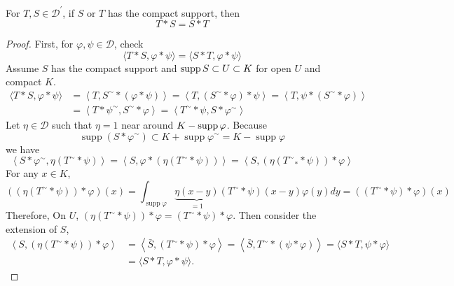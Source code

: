 \begin{enumerate}[label=\arabic*.]
	\begin{prop}
		For $T,S \in \mathcal{D}^\prime$, if $S$ or $T$ has the compact support, then
		\begin{equation*}
			T*S = S*T
		\end{equation*}
	\end{prop}
	\begin{proof}
		First, for $\varphi,\psi \in \mathcal{D}$, check
		\begin{equation*}
			\langle T * S, \varphi * \psi\rangle=\langle S * T, \varphi * \psi\rangle
		\end{equation*}
		Assume $S$ has the compact support and $\operatorname{supp} S \subset U \subset K$ for open $U$ and compact $K$. 
		\begin{equation*}
			\begin{aligned}
				\langle T * S, \varphi * \psi\rangle & =\left\langle T, S^{\sim} *(\varphi * \psi)\right\rangle=\left\langle T,\left(S^{\sim} * \varphi\right) * \psi\right\rangle=\left\langle T, \psi *\left(S^{\sim} * \varphi\right)\right\rangle \\
				& =\left\langle T * \psi^{\sim}, S^{\sim} * \varphi\right\rangle=\left\langle T^{\sim} * \psi, S * \varphi^{\sim}\right\rangle
			\end{aligned}
		\end{equation*}
		Let $\eta \in \mathcal{D}$ such that $\eta = 1$ near around $K - \operatorname{supp} \varphi$. Because
		\begin{equation*}
			\operatorname{supp}\left(S * \varphi^{\sim}\right) \subset K+\operatorname{supp} \varphi^\sim = K-\operatorname{supp} \varphi
		\end{equation*}
		we have
		\begin{equation*}
			\left\langle S * \varphi^{\sim}, \eta\left(T^{\sim} * \psi\right)\right\rangle=\left\langle S, \varphi *\left(\eta\left(T^{\sim} * \psi\right)\right)\right\rangle=\left\langle S,\left(\eta\left(T^{\sim}{ }_* * \psi\right)\right) * \varphi\right\rangle
		\end{equation*}
		For any $x \in K$,
		\begin{equation*}
			\left(\left(\eta\left(T^{\sim} * \psi\right)\right) * \varphi\right)(x)=\int_{\operatorname{supp} \varphi} \underbrace{\eta(x-y)}_{=1}\left(T^{\sim} * \psi\right)(x-y) \varphi(y) d y=\left(\left(T^{\sim} * \psi\right) * \varphi\right)(x)
		\end{equation*}
		Therefore, On $U$, $\left(\eta\left(T^{\sim} * \psi\right)\right) * \varphi =\left(T^{\sim} * \psi\right) * \varphi$. Then consider the extension of $S$,
		\begin{equation*}
			\begin{aligned}
				\left\langle S,\left(\eta\left(T^{\sim} * \psi\right)\right) * \varphi\right\rangle & =\left\langle\bar{S},\left(T^{\sim} * \psi\right) * \varphi\right\rangle=\left\langle\bar{S}, T^{\sim} *(\psi * \varphi)\right\rangle=\langle S * T, \psi * \varphi\rangle \\
				& =\langle S * T, \varphi * \psi\rangle .
			\end{aligned}
		\end{equation*}


\end{proof}
\end{enumerate}
